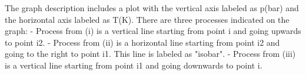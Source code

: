 The graph description includes a plot with the vertical axis labeled as p(bar) and the horizontal axis labeled as T(K). There are three processes indicated on the graph:
- Process from (i) is a vertical line starting from point i and going upwards to point i2.
- Process from (ii) is a horizontal line starting from point i2 and going to the right to point i1. This line is labeled as "isobar".
- Process from (iii) is a vertical line starting from point i1 and going downwards to point i.